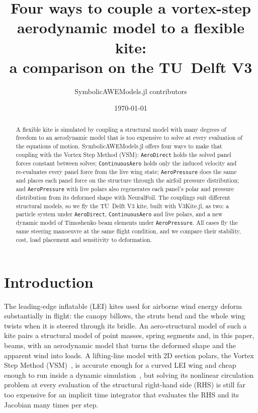 \documentclass[11pt,a4paper]{article}
\title{Four ways to couple a vortex-step aerodynamic model to a flexible kite:\\
a comparison on the TU~Delft V3}
\author{SymbolicAWEModels.jl contributors}
\date{\today}
\newcommand{\code}[1]{\texttt{#1}}
\begin{document}
\maketitle

\begin{abstract}
A flexible kite is simulated by coupling a structural model with many degrees of freedom to an aerodynamic model that is too expensive to solve at every evaluation of the equations of motion. SymbolicAWEModels.jl offers four ways to make that coupling with the Vortex Step Method (VSM): \code{AeroDirect} holds the solved panel forces constant between solves; \code{ContinuousAero} holds only the induced velocity and re-evaluates every panel force from the live wing state; \code{AeroPressure} does the same and places each panel force on the structure through the airfoil pressure distribution; and \code{AeroPressure} with live polars also regenerates each panel's polar and pressure distribution from its deformed shape with NeuralFoil. The couplings suit different structural models, so we fly the TU~Delft V3 kite, built with V3Kite.jl, as two: a particle system under \code{AeroDirect}, \code{ContinuousAero} and live polars, and a new dynamic model of Timoshenko beam elements under \code{AeroPressure}. All cases fly the same steering manoeuvre at the same flight condition, and we compare their stability, cost, load placement and sensitivity to deformation.
\end{abstract}

\section{Introduction}

The leading-edge inflatable (LEI) kites used for airborne wind energy deform substantially in flight: the canopy billows, the struts bend and the whole wing twists when it is steered through its bridle. An aero-structural model of such a kite pairs a structural model of point masses, spring segments and, in this paper, beams, with an aerodynamic model that turns the deformed shape and the apparent wind into loads. A lifting-line model with 2D section polars, the Vortex Step Method (VSM)~\citep{cayon2023vsm,vortexstepmethod}, is accurate enough for a curved LEI wing and cheap enough to run inside a dynamic simulation~\citep{poland2023}, but solving its nonlinear circulation problem at every evaluation of the structural right-hand side (RHS) is still far too expensive for an implicit time integrator that evaluates the RHS and its Jacobian many times per step.
\end{document}
